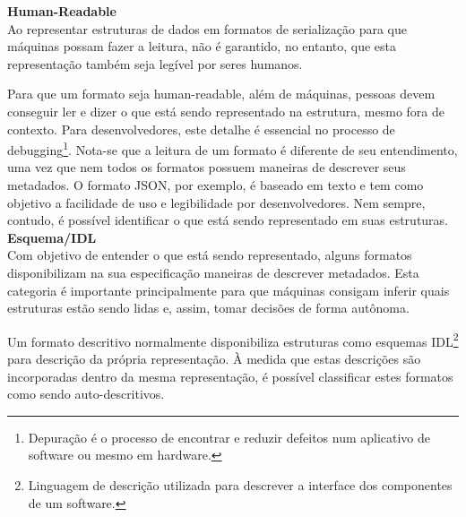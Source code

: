 \textbf{Human-Readable} \\

Ao representar estruturas de dados em formatos de serialização para que máquinas possam fazer a leitura, não é garantido, no entanto, que esta representação também seja legível por seres humanos.

Para que um formato seja human-readable, além de máquinas, pessoas devem conseguir ler e dizer o que está sendo representado na estrutura, mesmo fora de contexto. Para desenvolvedores, este detalhe é essencial no processo de debugging\footnote{
  Depuração é o processo de encontrar e reduzir defeitos num aplicativo de software ou mesmo em hardware.
}. Nota-se que a leitura de um formato é diferente de seu entendimento, uma vez que nem todos os formatos possuem maneiras de descrever seus metadados. O formato JSON, por exemplo, é baseado em texto e tem como objetivo a facilidade de uso e legibilidade por desenvolvedores. Nem sempre, contudo, é possível identificar o que está sendo representado em suas estruturas. \cite{SumarayMakki2012} \\

\textbf{Esquema/IDL} \\

Com objetivo de entender o que está sendo representado, alguns formatos disponibilizam na sua especificação maneiras de descrever metadados. Esta categoria é importante principalmente para que máquinas consigam inferir quais estruturas estão sendo lidas e, assim, tomar decisões de forma autônoma.

Um formato descritivo normalmente disponibiliza estruturas como esquemas IDL\footnote{
  Linguagem de descrição utilizada para descrever a interface dos componentes de um software.
} para descrição da própria representação. À medida que estas descrições são incorporadas dentro da mesma representação, é possível classificar estes formatos como sendo auto-descritivos. \cite{Rentachintala2014}
